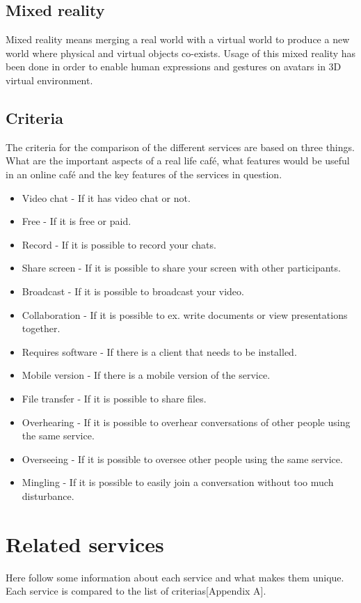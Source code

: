 \documentclass[12pt, titlepage]{article}
\begin{document}
\subsection{Mixed reality}
Mixed reality means merging a real world with a virtual world to produce a new world where physical and virtual objects co-exists. Usage of this mixed reality has been done in order to enable human expressions and gestures on avatars in 3D virtual environment\cite{7}.
\subsection{Criteria}
The criteria for the comparison of the different services are based on three things. What are the important aspects of a real life café, what features would be useful in an online café and the key features of the services in question.
\begin{itemize}
\item Video chat - If it has video chat or not.
\item Free - If it is free or paid.
\item Record - If it is possible to record your chats.
\item Share screen - If it is possible to share your screen with other participants.
\item Broadcast - If it is possible to broadcast your video.
\item Collaboration - If it is possible to ex. write documents or view presentations together.
\item Requires software - If there is a client that needs to be installed.
\item Mobile version - If there is a mobile version of the service.
\item File transfer - If it is possible to share files.
\item Overhearing - If it is possible to overhear conversations of other people using the same service.
\item Overseeing - If it is possible to oversee other people using the same service.
\item Mingling - If it is possible to easily join a conversation without too much disturbance.
\end{itemize}
\section{Related services}
Here follow some information about each service and what makes them unique. Each service is compared to the list of criterias[Appendix A].
\end{document}

